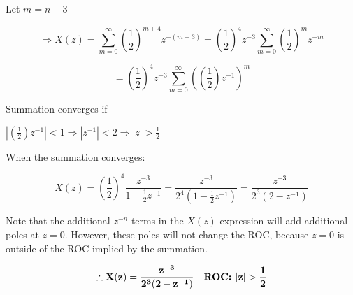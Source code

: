 \documentclass[fleqn]{article}
\begin{document}
\begin{enumerate}[nolistsep]
\begin{enumerate}[nolistsep]
					Let $m = n - 3$
					
					\begin{equation*}
						\Rightarrow X(z) = \sum_{m=0}^{\infty}\left(\frac{1}{2}\right)^{m+4}z^{-(m+3)} = \left(\frac{1}{2}\right)^{4}z^{-3}\sum_{m=0}^{\infty}\left(\frac{1}{2}\right)^{m}z^{-m}
					\end{equation*}
					
					\begin{equation*}
						 = \left(\frac{1}{2}\right)^{4}z^{-3}\sum_{m=0}^{\infty}\left(\left(\frac{1}{2}\right)z^{-1}\right)^{m}
					\end{equation*}
					
					Summation converges if
					
					$\left|\left(\frac{1}{2}\right)z^{-1}\right| < 1 \Rightarrow |z^{-1}| < 2 \Rightarrow |z| > \frac{1}{2}$
					
					When the summation converges:
					
					\begin{equation*}
						X(z) = \left(\frac{1}{2}\right)^{4}\frac{z^{-3}}{1 - \frac{1}{2}z^{-1}} = \frac{z^{-3}}{2^{4}(1 - \frac{1}{2}z^{-1})} = \frac{z^{-3}}{2^{3}(2 - z^{-1})}
					\end{equation*}
					
					Note that the additional $z^{-n}$ terms in the $X(z)$ expression will add additional poles at $z = 0$. However, these poles will not change the ROC, because $z = 0$ is outside of the ROC implied by the summation. 
					
					\begin{equation*}
						\mathbf{\therefore X(z) = \frac{z^{-3}}{2^{3}(2 - z^{-1})} \quad \text{\textbf{ROC: }} |z| > \frac{1}{2}}
					\end{equation*}
			\end{enumerate}
	\end{enumerate}
\end{document}
